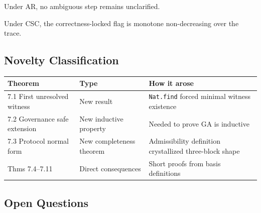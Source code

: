 \begin{theorem}
Under AR, no ambiguous step remains unclarified.
\end{theorem}

\begin{theorem}
Under CSC, the correctness-locked flag is monotone non-decreasing over the trace.
\end{theorem}

\subsection{Novelty Classification}

\begin{center}
\begin{tabular}{lll}
\toprule
Theorem & Type & How it arose \\
\midrule
7.1 First unresolved witness & New result & \texttt{Nat.find} forced minimal witness existence \\
7.2 Governance safe extension & New inductive property & Needed to prove $\mathrm{GA}$ is inductive \\
7.3 Protocol normal form & New completeness theorem & Admissibility definition crystallized three-block shape \\
Thms 7.4--7.11 & Direct consequences & Short proofs from basis definitions \\
\bottomrule
\end{tabular}
\end{center}

\subsection{Open Questions}

